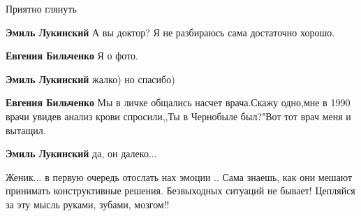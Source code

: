 \begin{itemize}
Приятно глянуть

\begin{itemize}
 
\textbf{Эмиль Лукинский} А вы доктор? Я не разбираюсь сама достаточно хорошо.

 
\textbf{Евгения Бильченко} Я о фото.

 
\textbf{Эмиль Лукинский} жалко) но спасибо)

 
\textbf{Евгения Бильченко} Мы в личке общались насчет врача.Скажу одно,мне в 1990 врачи увидев анализ крови спросили,,Ты в Чернобыле был?"Вот тот врач меня и вытащил.

 
\textbf{Эмиль Лукинский} да, он далеко...
\end{itemize}

 

Женик... в первую очередь отослать нах эмоции .. Сама знаешь, как они мешают
принимать конструктивные решения. Безвыходных ситуаций не бывает! Цепляйся за
эту мысль руками, зубами, мозгом!!


\end{itemize}
